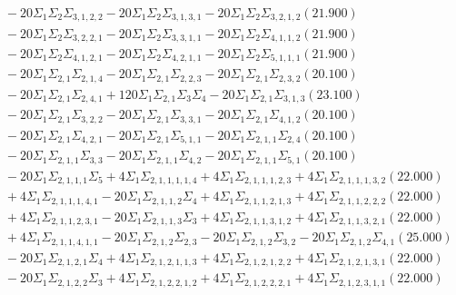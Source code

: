 \documentclass[12pt]{article}
\begin{document}
\begin{landscape}
\begin{align*}
		&\quad\quad -20\Sigma_{1}\Sigma_{2}\Sigma_{3,1,2,2}-20\Sigma_{1}\Sigma_{2}\Sigma_{3,1,3,1}-20\Sigma_{1}\Sigma_{2}\Sigma_{3,2,1,2}(21.900) \\ 
		&\quad\quad -20\Sigma_{1}\Sigma_{2}\Sigma_{3,2,2,1}-20\Sigma_{1}\Sigma_{2}\Sigma_{3,3,1,1}-20\Sigma_{1}\Sigma_{2}\Sigma_{4,1,1,2}(21.900) \\ 
		&\quad\quad -20\Sigma_{1}\Sigma_{2}\Sigma_{4,1,2,1}-20\Sigma_{1}\Sigma_{2}\Sigma_{4,2,1,1}-20\Sigma_{1}\Sigma_{2}\Sigma_{5,1,1,1}(21.900) \\ 
		&\quad\quad -20\Sigma_{1}\Sigma_{2,1}\Sigma_{2,1,4}-20\Sigma_{1}\Sigma_{2,1}\Sigma_{2,2,3}-20\Sigma_{1}\Sigma_{2,1}\Sigma_{2,3,2}(20.100) \\ 
		&\quad\quad -20\Sigma_{1}\Sigma_{2,1}\Sigma_{2,4,1}+120\Sigma_{1}\Sigma_{2,1}\Sigma_{3}\Sigma_{4}-20\Sigma_{1}\Sigma_{2,1}\Sigma_{3,1,3}(23.100) \\ 
		&\quad\quad -20\Sigma_{1}\Sigma_{2,1}\Sigma_{3,2,2}-20\Sigma_{1}\Sigma_{2,1}\Sigma_{3,3,1}-20\Sigma_{1}\Sigma_{2,1}\Sigma_{4,1,2}(20.100) \\ 
		&\quad\quad -20\Sigma_{1}\Sigma_{2,1}\Sigma_{4,2,1}-20\Sigma_{1}\Sigma_{2,1}\Sigma_{5,1,1}-20\Sigma_{1}\Sigma_{2,1,1}\Sigma_{2,4}(20.100) \\ 
		&\quad\quad -20\Sigma_{1}\Sigma_{2,1,1}\Sigma_{3,3}-20\Sigma_{1}\Sigma_{2,1,1}\Sigma_{4,2}-20\Sigma_{1}\Sigma_{2,1,1}\Sigma_{5,1}(20.100) \\ 
		&\quad\quad -20\Sigma_{1}\Sigma_{2,1,1,1}\Sigma_{5}+4\Sigma_{1}\Sigma_{2,1,1,1,1,4}+4\Sigma_{1}\Sigma_{2,1,1,1,2,3}+4\Sigma_{1}\Sigma_{2,1,1,1,3,2}(22.000) \\ 
		&\quad\quad +4\Sigma_{1}\Sigma_{2,1,1,1,4,1}-20\Sigma_{1}\Sigma_{2,1,1,2}\Sigma_{4}+4\Sigma_{1}\Sigma_{2,1,1,2,1,3}+4\Sigma_{1}\Sigma_{2,1,1,2,2,2}(22.000) \\ 
		&\quad\quad +4\Sigma_{1}\Sigma_{2,1,1,2,3,1}-20\Sigma_{1}\Sigma_{2,1,1,3}\Sigma_{3}+4\Sigma_{1}\Sigma_{2,1,1,3,1,2}+4\Sigma_{1}\Sigma_{2,1,1,3,2,1}(22.000) \\ 
		&\quad\quad +4\Sigma_{1}\Sigma_{2,1,1,4,1,1}-20\Sigma_{1}\Sigma_{2,1,2}\Sigma_{2,3}-20\Sigma_{1}\Sigma_{2,1,2}\Sigma_{3,2}-20\Sigma_{1}\Sigma_{2,1,2}\Sigma_{4,1}(25.000) \\ 
		&\quad\quad -20\Sigma_{1}\Sigma_{2,1,2,1}\Sigma_{4}+4\Sigma_{1}\Sigma_{2,1,2,1,1,3}+4\Sigma_{1}\Sigma_{2,1,2,1,2,2}+4\Sigma_{1}\Sigma_{2,1,2,1,3,1}(22.000) \\ 
		&\quad\quad -20\Sigma_{1}\Sigma_{2,1,2,2}\Sigma_{3}+4\Sigma_{1}\Sigma_{2,1,2,2,1,2}+4\Sigma_{1}\Sigma_{2,1,2,2,2,1}+4\Sigma_{1}\Sigma_{2,1,2,3,1,1}(22.000) \\ 

\end{align*}
\end{landscape}
\end{document}
